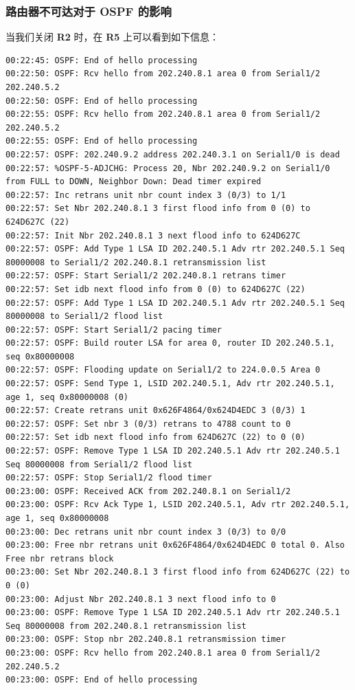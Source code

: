 \documentclass[black,normal,cn]{elegantnote}
\begin{document}
\subsubsection{路由器不可达对于 OSPF 的影响}
当我们关闭 \textbf{R2} 时，在 \textbf{R5} 上可以看到如下信息：
\begin{lstlisting}
00:22:45: OSPF: End of hello processing
00:22:50: OSPF: Rcv hello from 202.240.8.1 area 0 from Serial1/2 202.240.5.2
00:22:50: OSPF: End of hello processing
00:22:55: OSPF: Rcv hello from 202.240.8.1 area 0 from Serial1/2 202.240.5.2
00:22:55: OSPF: End of hello processing
00:22:57: OSPF: 202.240.9.2 address 202.240.3.1 on Serial1/0 is dead
00:22:57: %OSPF-5-ADJCHG: Process 20, Nbr 202.240.9.2 on Serial1/0 from FULL to DOWN, Neighbor Down: Dead timer expired
00:22:57: Inc retrans unit nbr count index 3 (0/3) to 1/1
00:22:57: Set Nbr 202.240.8.1 3 first flood info from 0 (0) to 624D627C (22)
00:22:57: Init Nbr 202.240.8.1 3 next flood info to 624D627C
00:22:57: OSPF: Add Type 1 LSA ID 202.240.5.1 Adv rtr 202.240.5.1 Seq 80000008 to Serial1/2 202.240.8.1 retransmission list
00:22:57: OSPF: Start Serial1/2 202.240.8.1 retrans timer
00:22:57: Set idb next flood info from 0 (0) to 624D627C (22)
00:22:57: OSPF: Add Type 1 LSA ID 202.240.5.1 Adv rtr 202.240.5.1 Seq 80000008 to Serial1/2 flood list
00:22:57: OSPF: Start Serial1/2 pacing timer
00:22:57: OSPF: Build router LSA for area 0, router ID 202.240.5.1, seq 0x80000008
00:22:57: OSPF: Flooding update on Serial1/2 to 224.0.0.5 Area 0
00:22:57: OSPF: Send Type 1, LSID 202.240.5.1, Adv rtr 202.240.5.1, age 1, seq 0x80000008 (0)
00:22:57: Create retrans unit 0x626F4864/0x624D4EDC 3 (0/3) 1
00:22:57: OSPF: Set nbr 3 (0/3) retrans to 4788 count to 0
00:22:57: Set idb next flood info from 624D627C (22) to 0 (0)
00:22:57: OSPF: Remove Type 1 LSA ID 202.240.5.1 Adv rtr 202.240.5.1 Seq 80000008 from Serial1/2 flood list
00:22:57: OSPF: Stop Serial1/2 flood timer
00:23:00: OSPF: Received ACK from 202.240.8.1 on Serial1/2
00:23:00: OSPF: Rcv Ack Type 1, LSID 202.240.5.1, Adv rtr 202.240.5.1, age 1, seq 0x80000008
00:23:00: Dec retrans unit nbr count index 3 (0/3) to 0/0
00:23:00: Free nbr retrans unit 0x626F4864/0x624D4EDC 0 total 0. Also Free nbr retrans block
00:23:00: Set Nbr 202.240.8.1 3 first flood info from 624D627C (22) to 0 (0)
00:23:00: Adjust Nbr 202.240.8.1 3 next flood info to 0
00:23:00: OSPF: Remove Type 1 LSA ID 202.240.5.1 Adv rtr 202.240.5.1 Seq 80000008 from 202.240.8.1 retransmission list
00:23:00: OSPF: Stop nbr 202.240.8.1 retransmission timer
00:23:00: OSPF: Rcv hello from 202.240.8.1 area 0 from Serial1/2 202.240.5.2
00:23:00: OSPF: End of hello processing
\end{lstlisting}
\end{document}
